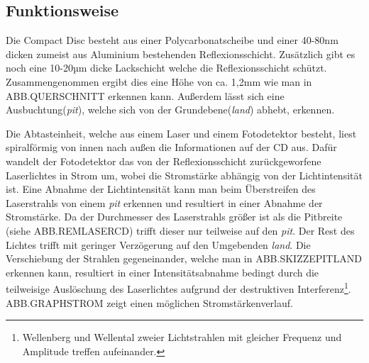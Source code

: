 \subsection{Funktionsweise}
\label{subsec:cdfunktionsweise}

Die Compact Disc besteht aus einer Polycarbonatscheibe und einer 40-80nm dicken
zumeist aus Aluminium bestehenden Reflexionsschicht. Zusätzlich gibt es noch
eine 10-20µm dicke Lackschicht welche die Reflexionsschicht schützt.
Zusammengenommen ergibt dies eine Höhe von ca. 1,2mm wie man in ABB.QUERSCHNITT
erkennen kann. Außerdem lässt sich eine Ausbuchtung(\textit{pit}), welche sich
von der Grundebene(\textit{land}) abhebt, erkennen. \cite{cfcd}

Die Abtasteinheit, welche aus einem Laser und einem Fotodetektor besteht, liest
spiralförmig von innen nach außen die Informationen auf der CD aus. Dafür
wandelt der Fotodetektor das von der Reflexionsschicht zurückgeworfene
Laserlichtes in Strom um, wobei die Stromstärke abhängig von der Lichtintensität
ist. Eine Abnahme der Lichtintensität kann man beim Überstreifen des
Laserstrahls von einem \textit{pit} erkennen und resultiert in einer Abnahme der
Stromstärke. Da der Durchmesser des Laserstrahls größer ist als die Pitbreite
(siehe ABB.REMLASERCD) trifft dieser nur teilweise auf den \textit{pit}. Der
Rest des Lichtes trifft mit geringer Verzögerung auf den Umgebenden
\textit{land}. Die Verschiebung der Strahlen gegeneinander, welche man in
ABB.SKIZZEPITLAND erkennen kann, resultiert in einer Intensitätsabnahme bedingt
durch die teilweisige Auslöschung des Laserlichtes aufgrund der destruktiven
Interferenz\footnote{Wellenberg und Wellental zweier Lichtstrahlen mit gleicher
Frequenz und Amplitude treffen aufeinander.}. ABB.GRAPHSTROM zeigt einen
möglichen Stromstärkenverlauf. \cite{cdp}
